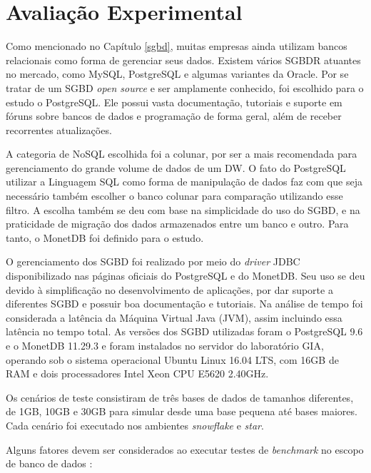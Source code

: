 \graphicspath{ {6-Experimento/} }

\chapter{Avaliação Experimental}

Como mencionado no Capítulo \ref{sgbd}, muitas empresas ainda utilizam 
bancos relacionais como forma de gerenciar seus dados. Existem vários SGBDR 
atuantes no mercado, como MySQL, PostgreSQL e algumas variantes da Oracle. 
Por se tratar de um SGBD \textit{open source} e ser amplamente 
conhecido, foi escolhido para o estudo o PostgreSQL. Ele possui vasta 
documentação, tutoriais e suporte em fóruns sobre bancos de dados e 
programação de forma geral, além de receber recorrentes atualizações. 

A categoria de NoSQL escolhida foi a colunar, por ser a mais 
recomendada para gerenciamento do grande volume de dados de um DW. 
O fato do PostgreSQL utilizar a Linguagem SQL como forma de 
manipulação de dados faz com que seja necessário também escolher 
o banco colunar para comparação utilizando esse filtro. A escolha também 
se deu com base na simplicidade do uso do SGBD, e na praticidade de 
migração dos dados armazenados entre um banco e outro. Para tanto, 
o MonetDB foi definido para o estudo.

O gerenciamento dos SGBD foi realizado por meio do \textit{driver} JDBC 
disponibilizado nas páginas oficiais do PostgreSQL e do MonetDB. Seu uso se deu 
devido à simplificação no desenvolvimento de aplicações, por dar suporte a 
diferentes SGBD e possuir boa documentação e tutoriais. Na análise de tempo 
foi considerada a latência da Máquina Virtual Java (JVM), assim incluindo essa 
latência no tempo total. As versões dos SGBD utilizadas 
foram o PostgreSQL 9.6 e o MonetDB 11.29.3 e foram instalados no servidor do laboratório GIA, operando sob o 
sistema operacional Ubuntu Linux 16.04 LTS, com 16GB de RAM e dois 
processadores Intel Xeon CPU E5620 2.40GHz.

Os cenários de teste consistiram de três bases de dados de tamanhos 
diferentes, de 1GB, 10GB e 30GB para simular desde uma base pequena 
até bases maiores. Cada cenário foi executado nos ambientes \textit{snowflake} e 
\textit{star}.

Alguns fatores devem ser considerados ao executar testes de \textit{benchmark} 
no escopo de banco de dados \cite{raasveldt2018fair}:

